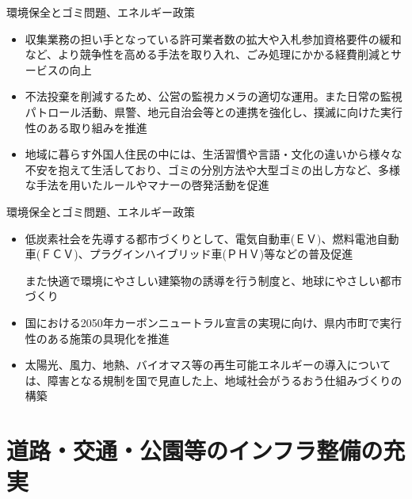 \documentclass[dvipdfmx]{beamer}
\begin{document}
    \begin{frame}{環境保全とゴミ問題、エネルギー政策}{}
        \begin{small}
            \begin{itemize}
                \setlength{\parsep}{.5mm}
                \setlength{\itemsep}{2mm}
                \item 収集業務の担い手となっている許可業者数の拡大や入札参加資格要件の緩和など、より競争性を高める手法を取り入れ、ごみ処理にかかる経費削減とサービスの向上
                \item 不法投棄を削減するため、公営の監視カメラの適切な運用。また日常の監視パトロール活動、県警、地元自治会等との連携を強化し、撲滅に向けた実行性のある取り組みを推進
                \item 地域に暮らす外国人住民の中には、生活習慣や言語・文化の違いから様々な不安を抱えて生活しており、ゴミの分別方法や大型ゴミの出し方など、多様な手法を用いたルールやマナーの啓発活動を促進
            \end{itemize}
        \end{small}
    \end{frame}

    \begin{frame}{環境保全とゴミ問題、エネルギー政策}{}
        \begin{small}
            \begin{itemize}
                \setlength{\parsep}{.5mm}
                \setlength{\itemsep}{2mm}
                \item 低炭素社会を先導する都市づくりとして、電気自動車(ＥＶ)、燃料電池自動車(ＦＣＶ)、プラグインハイブリッド車(ＰＨＶ)等などの普及促進\par
                また快適で環境にやさしい建築物の誘導を行う制度と、地球にやさしい都市づくり
                \item 国における2050年カーボンニュートラル宣言の実現に向け、県内市町で実行性のある施策の具現化を推進
                \item 太陽光、風力、地熱、バイオマス等の再生可能エネルギーの導入については、障害となる規制を国で見直した上、地域社会がうるおう仕組みづくりの構築
            \end{itemize}
        \end{small}
    \end{frame}

\section{道路・交通・公園等のインフラ整備の充実}
    \begin{frame}{}{}
        \sectionpage
    \end{frame}
\end{document}
